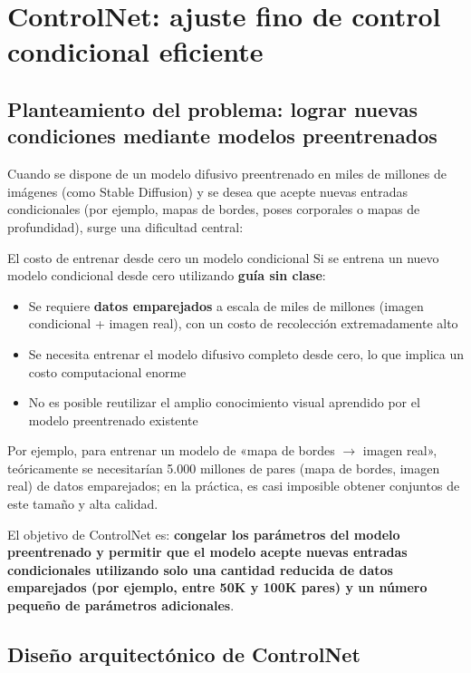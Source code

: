 \section{ControlNet: ajuste fino de control condicional eficiente}

\subsection{Planteamiento del problema: lograr nuevas condiciones mediante modelos preentrenados}

Cuando se dispone de un modelo difusivo preentrenado en miles de millones de imágenes (como Stable Diffusion) y se desea que acepte nuevas entradas condicionales (por ejemplo, mapas de bordes, poses corporales o mapas de profundidad), surge una dificultad central:

\begin{warningbox}{El costo de entrenar desde cero un modelo condicional}
Si se entrena un nuevo modelo condicional desde cero utilizando \textbf{guía sin clase}:
\begin{itemize}
    \item Se requiere \textbf{datos emparejados} a escala de miles de millones (imagen condicional + imagen real), con un costo de recolección extremadamente alto
    \item Se necesita entrenar el modelo difusivo completo desde cero, lo que implica un costo computacional enorme
    \item No es posible reutilizar el amplio conocimiento visual aprendido por el modelo preentrenado existente
\end{itemize}
Por ejemplo, para entrenar un modelo de «mapa de bordes $\to$ imagen real», teóricamente se necesitarían 5.000 millones de pares (mapa de bordes, imagen real) de datos emparejados; en la práctica, es casi imposible obtener conjuntos de este tamaño y alta calidad.
\end{warningbox}

El objetivo de ControlNet es: \textbf{congelar los parámetros del modelo preentrenado y permitir que el modelo acepte nuevas entradas condicionales utilizando solo una cantidad reducida de datos emparejados (por ejemplo, entre 50K y 100K pares) y un número pequeño de parámetros adicionales}.

\subsection{Diseño arquitectónico de ControlNet}

